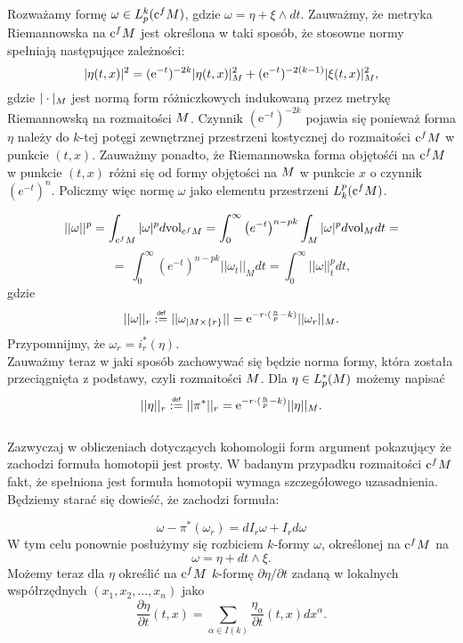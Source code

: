 \documentclass[licencjacka]{pracamgr}
\theoremstyle{definition}
\theoremstyle{definition}
\theoremstyle{plain}
\theoremstyle{plain}
\def\cfm{\ensuremath\mathrm{c}^fM}
\def\M{\ensuremath M}
\newcommand\deff{\mathrel{\overset{\makebox[0pt]{\mbox{\normalfont\tiny\sffamily def}}}{:=}}}
\begin{document}
Rozważamy formę $\omega \in L^k_p (\cfm)$, gdzie
$\omega = \eta + \xi \wedge dt$.
Zauważmy, że metryka Riemannowska na $\cfm$ jest określona w taki sposób, że
stosowne normy spełniają następujące zależności:
$$
| \eta(t,x) |^2 = (\mathrm{e}^{-t})^{-2k} | \eta(t,x) |^2_{\M} +
(\mathrm{e}^{-t})^{-2(k-1)} | \xi(t,x) |^2_{\M},
$$
gdzie $|\cdot |_{\M} $ jest normą form różniczkowych indukowaną przez
metrykę Riemannowską na rozmaitości $\M$.  Czynnik $(\mathrm{e}^{-t})^{-2k}$
pojawia się ponieważ forma $\eta$ należy do $k$-tej potęgi zewnętrznej
przestrzeni kostycznej do rozmaitości $\cfm$ w punkcie $(t,x)$.  Zauważmy
ponadto, że Riemannowska forma objętośći na $\cfm$ w punkcie $(t,x)$ różni się
od formy objętości na $\M$ w punkcie $x$ o czynnik $(e^{-t})^n$.  Policzmy więc
normę $\omega$ jako elementu przestrzeni $L_k^p (\cfm)$.

\[
    ||\omega ||^p = \int_{\cfm} |\omega |^p d \mathrm{vol}_{\cfm} =
    \int_0^\infty \left( e^{-t} \right)^{n-pk} \int_M |\omega|^p d
    \mathrm{vol}_M dt = 
\]
\[
    = \
    \int_0^\infty \left( e^{-t} \right)^{n-pk} || \omega_t ||_{M} dt = 
    \int_0^\infty || \omega ||_t^p dt,
\] 
gdzie
\[
|| \omega ||_r \deff || \omega_{|M \times \{r\} } || =
\mathrm{e}^{-r \cdot (\frac{n}{p} - k) }  ||\omega_r ||_{\M}.
\]
Przypomnijmy, że $\omega_r = i_r^\ast (\eta)$. \\

Zauważmy teraz w jaki sposób zachowywać się będzie norma formy, która
została przeciągnięta z podstawy, czyli rozmaitości $\M$. Dla 
$\eta \in L_p^\ast (\M)$ możemy napisać
\[
    || \eta ||_r \deff || \pi^\ast ||_r = 
\mathrm{e}^{-r \cdot (\frac{n}{p} - k) }  ||\eta ||_{\M}.
\] \\

Zazwyczaj w obliczeniach dotyczących kohomologii form argument pokazujący
że zachodzi formuła homotopii jest prosty. %
W badanym przypadku rozmaitości $\cfm$ fakt, że spełniona jest formuła homotopii
wymaga szczegółowego uzasadnienia. \\


Będziemy starać się dowieść, że zachodzi formuła:

\[
    \omega - \pi^\ast(\omega_r) = dI_r \omega + I_r d\omega
\]
W tym celu ponownie posłużymy się rozbiciem $k$-formy $\omega$, określonej na
$\cfm$ na
\[
    \omega = \eta + dt \wedge \xi.
\] 
Możemy teraz dla $\eta$ określić na $\cfm$ $k$-formę $\partial \eta / \partial
t$ zadaną w lokalnych współrzędnych $(x_1, x_2, ..., x_n)$ jako
\[
    \frac{\partial \eta}{\partial t} (t, x) =
    \sum_{\alpha \in I(k)} \frac{\eta_\alpha}{\partial t}(t, x) dx^\alpha.
\]
\end{document}
